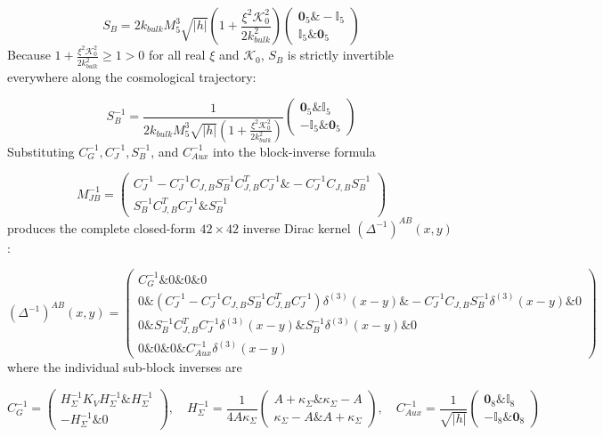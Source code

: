 \documentclass[aps,prd,onecolumn,superscriptaddress,nofootinbib,longbibliography,10pt]{revtex4-2}
\begin{document}
  \[ S_B = 2k_{bulk}M_5^3\sqrt{|h|}\left(1 + \frac{\xi^2\mathcal{K}_0^2}{2k_{bulk}^2}\right)\begin{pmatrix} \mathbf{0}_5 \& -\mathbb{I}_5 \\ \mathbb{I}_5 \& \mathbf{0}_5 \end{pmatrix} \]
  Because \(1 + \frac{\xi^2\mathcal{K}_0^2}{2k_{bulk}^2} \ge 1 > 0\) for all real \(\xi\) and \(\mathcal{K}_0\), \(S_B\) is strictly invertible everywhere along the cosmological trajectory:


  \[ S_B^{-1} = \frac{1}{2k_{bulk}M_5^3\sqrt{|h|}\left(1 + \frac{\xi^2\mathcal{K}_0^2}{2k_{bulk}^2}\right)}\begin{pmatrix} \mathbf{0}_5 \& \mathbb{I}_5 \\ -\mathbb{I}_5 \& \mathbf{0}_5 \end{pmatrix} \]
  Substituting \(C_G^{-1}, C_J^{-1}, S_B^{-1}\), and \(C_{Aux}^{-1}\) into the block-inverse formula


  \[ M_{JB}^{-1} = \begin{pmatrix} C_J^{-1} - C_J^{-1}C_{J,B}S_B^{-1}C_{J,B}^T C_J^{-1} \& -C_J^{-1}C_{J,B}S_B^{-1} \\ S_B^{-1}C_{J,B}^T C_J^{-1} \& S_B^{-1} \end{pmatrix} \]
  produces the complete closed-form \(42 \times 42\) inverse Dirac kernel \((\Delta^{-1})^{AB}(x,y)\):


  \[ (\Delta^{-1})^{AB}(x,y) = \begin{pmatrix} C_G^{-1} \& 0 \& 0 \& 0 \\ 0 \& (C_J^{-1} - C_J^{-1}C_{J,B}S_B^{-1}C_{J,B}^T C_J^{-1})\delta^{(3)}(x-y) \& -C_J^{-1}C_{J,B}S_B^{-1}\delta^{(3)}(x-y) \& 0 \\ 0 \& S_B^{-1}C_{J,B}^T C_J^{-1}\delta^{(3)}(x-y) \& S_B^{-1}\delta^{(3)}(x-y) \& 0 \\ 0 \& 0 \& 0 \& C_{Aux}^{-1}\delta^{(3)}(x-y) \end{pmatrix} \]
  where the individual sub-block inverses are


  \[ C_G^{-1} = \begin{pmatrix} H_\Sigma^{-1}K_V H_\Sigma^{-1} \& H_\Sigma^{-1} \\ -H_\Sigma^{-1} \& 0 \end{pmatrix}, \quad H_\Sigma^{-1} = \frac{1}{4A\kappa_\Sigma}\begin{pmatrix} A + \kappa_\Sigma \& \kappa_\Sigma - A \\ \kappa_\Sigma - A \& A + \kappa_\Sigma \end{pmatrix}, \quad C_{Aux}^{-1} = \frac{1}{\sqrt{|h|}}\begin{pmatrix} \mathbf{0}_8 \& \mathbb{I}_8 \\ -\mathbb{I}_8 \& \mathbf{0}_8 \end{pmatrix} \]
\end{document}
